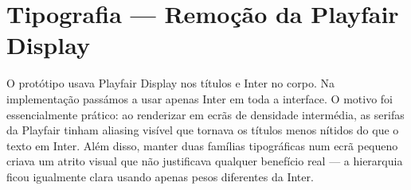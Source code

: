 \section{Tipografia --- Remoção da Playfair Display}
\label{chap5:sec:alt3}

O protótipo usava Playfair Display nos títulos e Inter no corpo. Na implementação passámos a usar apenas Inter em toda a interface. O motivo foi essencialmente prático: ao renderizar em ecrãs de densidade intermédia, as serifas da Playfair tinham aliasing visível que tornava os títulos menos nítidos do que o texto em Inter. Além disso, manter duas famílias tipográficas num ecrã pequeno criava um atrito visual que não justificava qualquer benefício real --- a hierarquia ficou igualmente clara usando apenas pesos diferentes da Inter.
